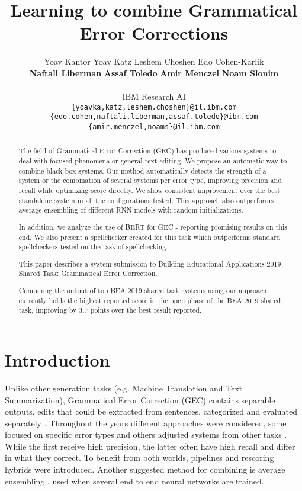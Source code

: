 \documentclass[11pt,a4paper]{article}
\title{Learning to combine Grammatical Error Corrections}
\author{ Yoav Kantor \enspace Yoav Katz \enspace Leshem Choshen\Thanks{Contributed equally} \enspace Edo Cohen-Karlik  \\ \enspace \textbf{Naftali Liberman} \enspace \textbf{Assaf Toledo} \enspace \textbf{Amir Menczel} \enspace \textbf{Noam Slonim} \\
\\IBM Research AI \\
   \texttt{\{yoavka,katz,leshem.choshen\}@il.ibm.com} \\
   \texttt{\{edo.cohen,naftali.liberman,assaf.toledo\}@ibm.com} \\ 
   \texttt{\{amir.menczel,noams\}}\texttt{@il.ibm.com}
  }
\date{}
\begin{document}
\maketitle
\begin{abstract}
  The field of Grammatical Error Correction (GEC) has produced various systems to deal with focused phenomena or general text editing. We propose an automatic way to combine black-box systems. Our method automatically detects the strength of a system or the combination of several systems per error type, improving precision and recall while optimizing  score directly.  We show consistent improvement over the best standalone system in all the configurations tested.
This approach also outperforms average ensembling of different RNN models with random initializations.

In addition, we analyze the use of BERT for GEC - reporting promising results on this end.  We also present a spellchecker created for this task which outperforms standard spellcheckers tested on the task of spellchecking.

This paper describes a system submission to Building Educational Applications 2019 Shared Task: Grammatical Error Correction\cite{bea2019}.

Combining the output of top BEA 2019 shared task systems using our approach, currently holds the highest reported score in the open phase of the BEA 2019 shared task, improving  by 3.7 points over the best result reported.





 \end{abstract}

\section{Introduction}\label{sec:intro}
Unlike other generation tasks (e.g. Machine Translation and Text Summarization), Grammatical Error Correction (GEC) contains separable outputs, edits that could be extracted from sentences, categorized \cite{Bryant2017AutomaticAA} and evaluated separately \cite{choshen2018automatic}. Throughout the years different approaches were considered, some  focused on specific error types \cite{rozovskaya2014correcting} and others adjusted systems from other tasks \cite{zhao2019improving}. While the first receive high precision, the latter often have high recall and differ in what they correct. To benefit from both worlds, pipelines \cite{rozovskaya2016grammatical} and rescoring hybrids \cite{grundkiewicz2018near} were introduced. Another suggested method for combining is average ensembling \cite{JunczysDowmunt2018ApproachingNG}, used when several end to end neural networks are trained.
\end{document}
